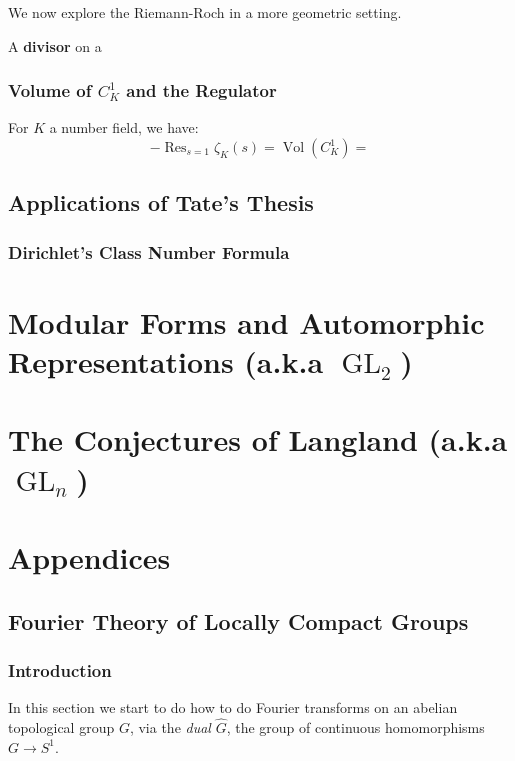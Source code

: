 \documentclass[11pt, x11names, openany]{book}
\renewcommand{\hat}{\widehat}
\DeclareMathOperator{\GL}{GL}
\DeclareMathOperator{\res}{Res}
\DeclareMathOperator{\vol}{Vol}
\begin{document}
We now explore the Riemann-Roch in a more geometric setting.
\begin{defn}
    A \textbf{divisor} on a 
\end{defn}

\subsection{Volume of $C^1_K$ and the Regulator}


\begin{theorem}
    For $K$ a number field, we have:
    \begin{equation}
        \label{eqn: C^1_K volume formula}
        -\res_{s = 1}\zeta_K(s) = \vol(C^1_K) = 
    \end{equation}
\end{theorem}


\section{Applications of Tate's Thesis}

\subsection{Dirichlet's Class Number Formula}



\chapter{Modular Forms and Automorphic Representations (a.k.a $\GL_2$)}


\chapter{The Conjectures of Langland (a.k.a $\GL_n$)}
\appendix


\chapter*{Appendices} 
\renewcommand{\thesection}{\Alph{section}}

\section{Fourier Theory of Locally Compact Groups}
\label{section: Pontryagin Duality}

\subsection*{Introduction}
In this section we start to do how to do Fourier transforms on an abelian topological group $G$, via the \textit{dual} $\hat{G}$, the group of continuous homomorphisms $G \to S^1$. 
\end{document}
